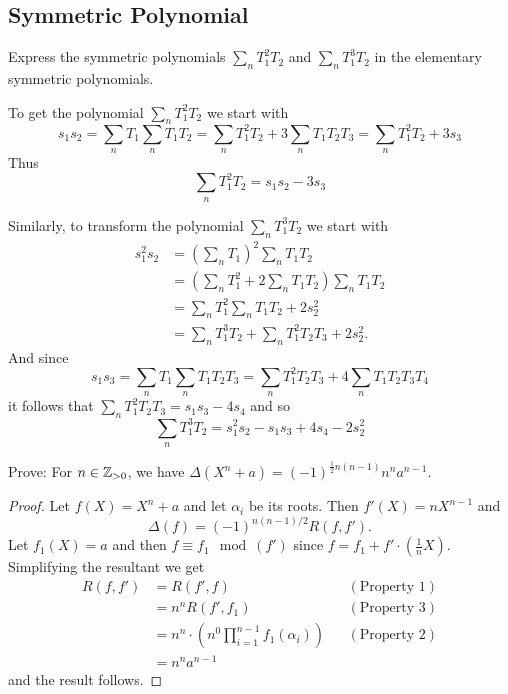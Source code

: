 \subsection{Symmetric Polynomial}
    \begin{ex}{14.10}
        Express the symmetric polynomials $\sum_n T_1^2T_2$ and $\sum_{n} T_1^3T_2$ in the elementary symmetric polynomials.
    \end{ex}
    \begin{sol}
        To get the polynomial $\sum_n T_1^2T_2$ we start with
        $$
            s_1s_2=\sum_n T_1\sum_n T_1T_2 = \sum_n T_1^2T_2+3\sum_n T_1T_2T_3 = \sum_n T_1^2T_2+3s_3
        $$
        Thus 
        $$
            \sum_n T_1^2T_2 = s_1s_2-3s_3
        $$

        Similarly, to transform the polynomial $\sum_{n} T_1^3T_2$ we start with
        \begin{align*}
            s_1^2s_2&=\left(\sum_nT_1\right)^2\sum_nT_1T_2\\
            &=\left(\sum_n T_1^2+2\sum_n T_1T_2\right)\sum_nT_1T_2\\
            &=\sum_nT_1^2\sum_n T_1T_2+2s_2^2\\
            &=\sum_nT_1^3T_2+\sum_n T_1^2T_2T_3+2s_2^2.
        \end{align*}
        And since
        $$
            s_1s_3=\sum_nT_1\sum_nT_1T_2T_3=\sum_nT_1^2T_2T_3+4\sum_n T_1T_2T_3T_4
        $$
        it follows that $\sum_n T_1^2T_2T_3=s_1s_3-4s_4$ and so
        $$
            \sum_{n} T_1^3T_2=s_1^2s_2-s_1s_3+4s_4-2s_2^2
        $$
    \end{sol}

    \begin{ex}{14.14}
        Prove: For $n\in\mathbb{Z}_{>0}$, we have $\Delta(X^n+a)=(-1)^{\frac12n(n-1)}n^na^{n-1}$.
    \end{ex}
    \begin{proof}
        Let $f(X)=X^n+a$ and let $\alpha_i$ be its roots. Then $f'(X)=nX^{n-1}$ and
        $$
            \Delta(f)=(-1)^{n(n-1)/2}R(f,f').
        $$
        Let $f_1(X)=a$ and then $f\equiv f_1\mod(f')$ since $f = f_1+f'\cdot\left(\frac1n X\right)$.
        Simplifying the resultant we get
        \begin{align*}
            R(f,f')&=R(f',f)&&(\text{Property }1)\\
            &=n^{n}R(f',f_1)&&(\text{Property }3)\\
            &=n^{n}\cdot\left(n^0\prod_{i=1}^{n-1}f_1(\alpha_i)\right)&&(\text{Property }2)\\
            &=n^n a^{n-1}
        \end{align*}
        and the result follows.
    \end{proof}


